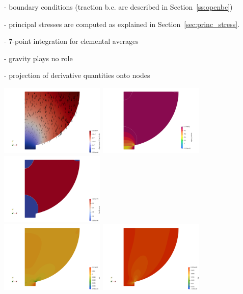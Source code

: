 - boundary conditions (traction b.c. are described in Section~\ref{ss:openbc})

- principal stresses are computed as explained in Section~\ref{sec:princ_stress}.

- 7-point integration for elemental averages

- gravity plays no role

- projection of derivative quantities onto nodes

\begin{center}
\includegraphics[width=5cm]{python_codes/fieldstone_63/results/disp}
\includegraphics[width=5cm]{python_codes/fieldstone_63/results/sigma1}
\includegraphics[width=5cm]{python_codes/fieldstone_63/results/tensilezone}\\
\includegraphics[width=5cm]{python_codes/fieldstone_63/results/exx}
\includegraphics[width=5cm]{python_codes/fieldstone_63/results/exy}

\end{center}
